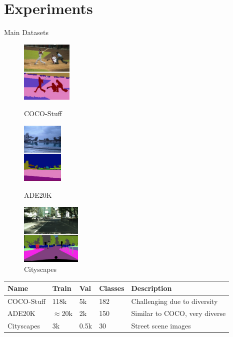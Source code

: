 \documentclass{beamer}
\begin{document}
\section{Experiments}
\begin{frame}{Main Datasets}
    \begin{figure}
        \begin{minipage}[b]{0.26\linewidth}
            \centering
            \includegraphics[height=110px]{figures/coco_stuff.png}
            \caption{COCO-Stuff}
        \end{minipage}
        \hspace{0.5cm}
        \begin{minipage}[b]{0.25\linewidth}
            \centering
            \includegraphics[height=110px]{figures/ade-20k.png}
            \caption{ADE20K}
        \end{minipage}
        \hspace{0.25cm}
        \begin{minipage}[b]{0.33\linewidth}
            \centering
            \includegraphics[height=110px]{figures/cityscapes.png}
            \caption{Cityscapes}
        \end{minipage}
    \end{figure}
    
    \begin{table}[]
    \begin{tabular}{|l|l|l|l|l|}
    \hline
    \textbf{Name} & \textbf{Train} & \textbf{Val} & \textbf{Classes} & \textbf{Description}             \\ \hline
    COCO-Stuff    & 118k           & 5k           & 182              & Challenging due to diversity \\ \hline
    ADE20K        & $\approx$20k          & 2k           & 150              & Similar to COCO, very diverse    \\ \hline
    Cityscapes    & 3k             & 0.5k          & 30               & Street scene images              \\ \hline
    \end{tabular}
    \end{table}
\end{frame}
\end{document}
